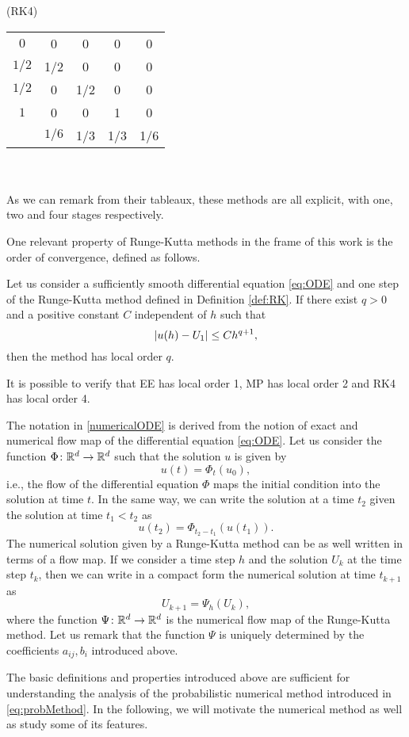 \begin{minipage}{0.5\linewidth} 
	\begin{center}
		(RK4)
		\begin{tabular}{c|cccc}
			$0$ & 0 & 0 & 0 & 0\\
			$1/2$ & 1/2 & 0 & 0 & 0\\
			$1/2$ & 0 & 1/2 & 0 & 0\\
			$1$ & 0 & 0 & 1 & 0\\
			\hline 
			&$1/6$ & 1/3 & 1/3 & 1/6
		\end{tabular}
	\end{center}
\end{minipage} \\ \\
As we can remark from their tableaux, these methods are all explicit, with one, two and four stages respectively.


One relevant property of Runge-Kutta methods in the frame of this work is the order of convergence, defined as follows. 
\begin{definition} Let us consider a sufficiently smooth differential equation \eqref{eq:ODE} and one step of the Runge-Kutta method defined in Definition \ref{def:RK}. If there exist $q > 0$ and a positive constant $C$ independent of $h$ such that 
\begin{equation}
	\abs{u(h)-U_1} \leq Ch^{q+1},
\end{equation}
then the method has local order $q$. 
\end{definition} 
\noindent It is possible to verify \cite{HLW02} that EE has local order 1, MP has local order 2 and RK4 has local order 4. 

The notation in \eqref{numericalODE} is derived from the notion of exact and numerical flow map of the differential equation \eqref{eq:ODE}. Let us consider the function $\Phi \colon \mathbb{R}^d \to \mathbb{R}^d$ such that the solution $u$ is given by
\begin{equation}
	u(t) = \Phi_t(u_0),
\end{equation}
i.e., the flow of the differential equation $\Phi$ maps the initial condition into the solution at time $t$. In the same way, we can write the solution at a time $t_2$ given the solution at time $t_1 < t_2$ as 
\begin{equation}
	u(t_2) = \Phi_{t_2 - t_1}(u(t_1)).
\end{equation}
The numerical solution given by a Runge-Kutta method can be as well written in terms of a flow map. If we consider a time step $h$ and the solution $U_k$ at the time step $t_k$, then we can write in a compact form the numerical solution at time $t_{k+1}$ as
\begin{equation}
	U_{k+1} = \Psi_h(U_k),
\end{equation}
where the function $\Psi\colon\mathbb{R}^d\to\mathbb{R}^d$ is the numerical flow map of the Runge-Kutta method. Let us remark that the function $\Psi$ is uniquely determined by the coefficients $a_{ij}, b_i$ introduced above.

The basic definitions and properties introduced above are sufficient for understanding the analysis of the probabilistic numerical method introduced in \eqref{eq:probMethod}. In the following, we will motivate the numerical method as well as study some of its features.
